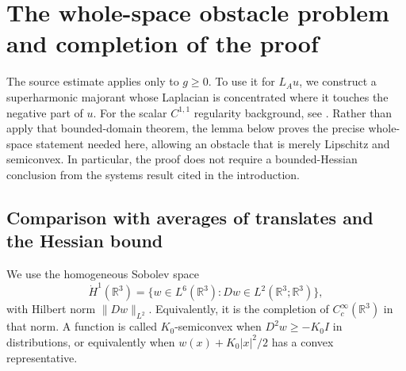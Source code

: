\documentclass[11pt,a4paper,reqno]{amsart}
\theoremstyle{plain}
\theoremstyle{remark}
\numberwithin{equation}{section}
\newcommand{\R}{\mathbb R}
\newcommand{\norm}[1]{\lVert#1\rVert}
\begin{document}
\section{The whole-space obstacle problem and completion of the proof}\label{sec:obstacle}
The source estimate applies only to $g\ge0$. To use it for $L_Au$, we construct a superharmonic majorant whose Laplacian is concentrated where it touches the negative part of $u$. For the scalar $C^{1,1}$ regularity background, see \cite[Theorem~1, p.~832]{BrezisKinderlehrer1974}. Rather than apply that bounded-domain theorem, the lemma below proves the precise whole-space statement needed here, allowing an obstacle that is merely Lipschitz and semiconvex. In particular, the proof does not require a bounded-Hessian conclusion from the systems result cited in the introduction.

\subsection{Comparison with averages of translates and the Hessian bound}
We use the homogeneous Sobolev space
\[
 \dot H^1(\R^3)=\{w\in L^6(\R^3):Dw\in L^2(\R^3;\R^3)\},
\]
with Hilbert norm $\norm{Dw}_{L^2}$. Equivalently, it is the completion of $C_c^\infty(\R^3)$ in that norm. A function is called $K_0$-semiconvex when $D^2w\ge-K_0I$ in distributions, or equivalently when $w(x)+K_0|x|^2/2$ has a convex representative.
\end{document}
